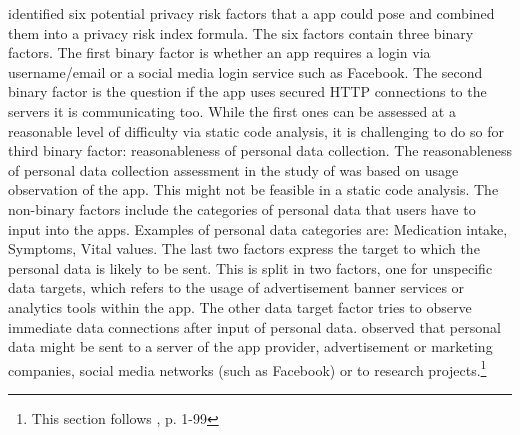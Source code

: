 \documentclass[
	a4paper,
	oneside,
	12pt,
	liststotocnumbered
]{article}
\let\cite\textcite
\begin{document}
\cite{Bruggemann2016} identified six potential privacy risk factors that a \mH app could pose and combined them into a privacy risk index formula. 
The six factors contain three binary factors.
The first binary factor is whether an app requires a login via username/email or a social media login service such as Facebook. 
The second binary factor is the question if the app uses secured \acs{HTTP} connections to the servers it is communicating too.
While the first ones can be assessed at a reasonable level of difficulty via static code analysis, it is challenging to do so for third binary factor: reasonableness of personal data collection. 
The reasonableness of personal data collection assessment in the study of \cite{Bruggemann2016} was based on usage observation of the app. This might not be feasible in a static code analysis.
The non-binary factors include the categories of personal data that users have to input into the \mH apps. Examples of personal data categories are: Medication intake, Symptoms, Vital values.
The last two factors express the target to which the personal data is likely to be sent. 
This is split in two factors, one for unspecific data targets, which refers to the usage of advertisement banner services or analytics tools within the app. 
The other data target factor tries to observe immediate data connections after input of personal data. 
\cite{Bruggemann2016} observed that personal data might be sent to a server of the app provider, advertisement or marketing companies, social media networks (such as Facebook) or to research projects.\footnote{This section follows \cite{Bruggemann2016}, p. 1-99}
\end{document}

